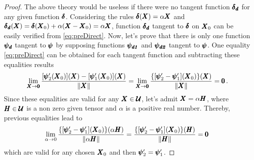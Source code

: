 {\footnotesize
\begin{proof}
The above theory would be useless if there were no tangent function $\pmb{\delta_\mathit{d}}$ for any given function $\pmb{\delta}$. Considering the rules $\pmb{\delta}(\pmb{X})=\alpha\pmb{X}$ and $\pmb{\delta_\mathit{d}}(\pmb{X})=\pmb{\delta}(\pmb{X}_0)+\alpha(\pmb{X}-\pmb{X}_0)=\alpha\pmb{X}$, function $\pmb{\delta_\mathit{d}}$ tangent to $\pmb{\delta}$ on $\pmb{X}_0$ can be easily verified from \eqref{eq:preDirect}. Now, let's prove that there is only one function $\pmb{\psi_\mathit{d}}$ tangent to $\pmb{\psi}$ by supposing functions $\pmb{\psi_\mathit{d1}}$ and $\pmb{\psi_\mathit{d2}}$ tangent to $\pmb{\psi}$. One equality \eqref{eq:preDirect} can be obtained for each tangent function and subtracting these equalities results
\begin{equation*}
\lim_{\pmb{X}\to \pmb{0}} \dfrac{[\pmb{\psi}'_2(\pmb{X}_0)](\pmb{X})-[\pmb{\psi}'_1(\pmb{X}_0)](\pmb{X})}{\|\pmb{X}\|}=\lim_{\pmb{X}\to \pmb{0}} \dfrac{\{[\pmb{\psi}'_2-\pmb{\psi}'_1](\pmb{X}_0)\}(\pmb{X})}{\|\pmb{X}\|}=\pmb{0}\,.
\end{equation*}
Since these equalities are valid for any $\pmb{X}\in\pmb{\mathcal{U}}$, let's admit $\pmb{X}=\alpha\pmb{H}$, where $\pmb{H}\in\pmb{\mathcal{U}}$ is a non zero given tensor and $\alpha$ is a positive real number. Thereby, previous equalities lead to
\begin{equation*}
	\lim_{\alpha\to 0} \dfrac{\{[\pmb{\psi}'_2-\pmb{\psi}'_1](\pmb{X}_0)\}(\alpha\pmb{H})}{\|\alpha\pmb{H}\|}=\dfrac{\{[\pmb{\psi}'_2-\pmb{\psi}'_1](\pmb{X}_0)\}(\pmb{H})}{\|\pmb{H}\|}=\pmb{0}\,
\end{equation*}
which are valid for any chosen $\pmb{X}_0$ and then $\pmb{\psi}'_2=\pmb{\psi}'_1$.
\end{proof}}

